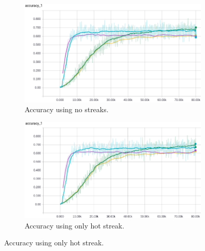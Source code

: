 \documentclass{article} %
\begin{document}
\begin{figure}[!htb]
  \begin{subfigure}{0.5\textwidth}
    \includegraphics[width=\linewidth]{plots/model1/wteam_onehot/streak-/accuracy.png}
    \caption{Accuracy using no streaks.}\label{fig:wteam-onehot--accuracy}
  \end{subfigure}
  \begin{subfigure}{0.5\textwidth}
    \includegraphics[width=\linewidth]{plots/model1/wteam_onehot/streak-h/accuracy.png}
    \caption{Accuracy using only hot streak.}\label{fig:wteam-onehot-h-accuracy}
  \end{subfigure}



\end{figure}
\end{document}
